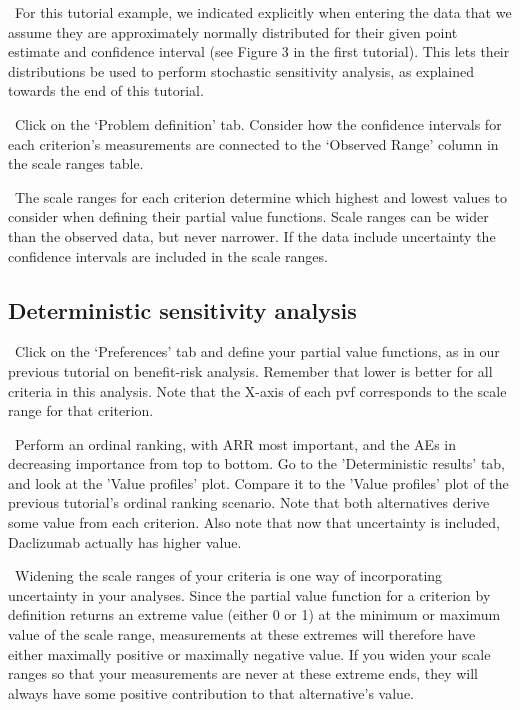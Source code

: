\documentclass[00_mcda_tutorial.tex]{subfiles}
\begin{document}
\noindent \faGraduationCap \, For this tutorial example, we indicated explicitly when entering the data that we assume they are approximately normally distributed for their given point estimate and confidence interval (see Figure 3 in the first tutorial). This lets their distributions be used to perform stochastic sensitivity analysis, as explained towards the end of this tutorial.
\newline

\noindent \leftpointright \, Click on the ‘Problem definition’ tab. Consider how the confidence intervals for each criterion’s measurements are connected to the ‘Observed Range’ column in the scale ranges table.
\newline

\noindent \faGraduationCap \, The scale ranges for each criterion determine which highest and lowest values to consider when defining their partial value functions. Scale ranges can be wider than the observed data, but never narrower. If the data include uncertainty the confidence intervals are included in the scale ranges.

\subsection*{Deterministic sensitivity analysis}
\noindent \leftpointright \, Click on the ‘Preferences’ tab and define your partial value functions, as in our previous tutorial on benefit-risk analysis. Remember that lower is better for all criteria in this analysis. Note that the X-axis of each pvf corresponds to the scale range for that criterion.
\newline

\noindent \leftpointright \, Perform an ordinal ranking, with ARR most important, and the AEs in decreasing importance from top to bottom. Go to the 'Deterministic results' tab, and look at the 'Value profiles' plot. Compare it to the 'Value profiles' plot of the previous tutorial’s ordinal ranking scenario. Note that both alternatives derive some value from each criterion. Also note that now that uncertainty is included, Daclizumab actually has higher value.
\newline

\noindent \faGraduationCap \, Widening the scale ranges of your criteria is one way of incorporating uncertainty in your analyses. Since the partial value function for a criterion by definition returns an extreme value (either 0 or 1) at the minimum or maximum value of the scale range, measurements at these extremes will therefore have either maximally positive or maximally negative value. If you widen your scale ranges so that your measurements are never at these extreme ends, they will always have some positive contribution to that alternative’s value.
\newline
\end{document}
